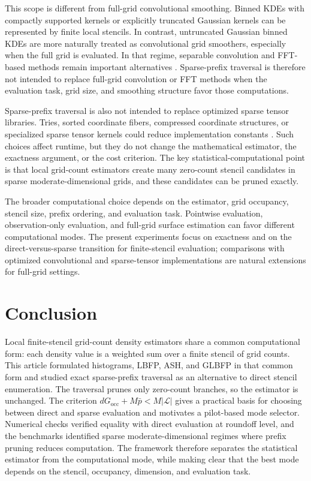 \documentclass[pdflatex,sn-mathphys-ay]{sn-jnl}
\theoremstyle{thmstyleone}
\newcommand{\stencil}{\mathcal{L}}
\begin{document}
This scope is different from full-grid convolutional smoothing. Binned KDEs with compactly supported kernels or explicitly truncated Gaussian kernels can be represented by finite local stencils. In contrast, untruncated Gaussian binned KDEs are more naturally treated as convolutional grid smoothers, especially when the full grid is evaluated. In that regime, separable convolution and FFT-based methods remain important alternatives \citep{Silverman1982FFT,Wand1994FastKDE,GramackiGramacki2017}. Sparse-prefix traversal is therefore not intended to replace full-grid convolution or FFT methods when the evaluation task, grid size, and smoothing structure favor those computations.

Sparse-prefix traversal is also not intended to replace optimized sparse tensor libraries. Tries, sorted coordinate fibers, compressed coordinate structures, or specialized sparse tensor kernels could reduce implementation constants \citep{Fredkin1960Trie,BaderKolda2007SparseTensor,KoldaBader2009TensorReview}. Such choices affect runtime, but they do not change the mathematical estimator, the exactness argument, or the cost criterion. The key statistical-computational point is that local grid-count estimators create many zero-count stencil candidates in sparse moderate-dimensional grids, and these candidates can be pruned exactly.

The broader computational choice depends on the estimator, grid occupancy, stencil size, prefix ordering, and evaluation task. Pointwise evaluation, observation-only evaluation, and full-grid surface estimation can favor different computational modes. The present experiments focus on exactness and on the direct-versus-sparse transition for finite-stencil evaluation; comparisons with optimized convolutional and sparse-tensor implementations are natural extensions for full-grid settings.

\section{Conclusion}

Local finite-stencil grid-count density estimators share a common computational form: each density value is a weighted sum over a finite stencil of grid counts. This article formulated histograms, LBFP, ASH, and GLBFP in that common form and studied exact sparse-prefix traversal as an alternative to direct stencil enumeration. The traversal prunes only zero-count branches, so the estimator is unchanged. The criterion \(dG_{\mathrm{occ}}+M\bar p<M|\stencil|\) gives a practical basis for choosing between direct and sparse evaluation and motivates a pilot-based mode selector. Numerical checks verified equality with direct evaluation at roundoff level, and the benchmarks identified sparse moderate-dimensional regimes where prefix pruning reduces computation. The framework therefore separates the statistical estimator from the computational mode, while making clear that the best mode depends on the stencil, occupancy, dimension, and evaluation task.
\end{document}
